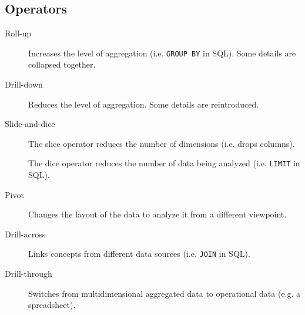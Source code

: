 \subsection{Operators}

\begin{description}
    \item[Roll-up] 
        Increases the level of aggregation (i.e. \texttt{GROUP BY} in SQL). Some details are collapsed together.

    \item[Drill-down] 
        Reduces the level of aggregation. Some details are reintroduced.
    
    \item[Slide-and-dice] 
        The slice operator reduces the number of dimensions (i.e. drops columns).

        The dice operator reduces the number of data being analyzed (i.e. \texttt{LIMIT} in SQL).

    \item[Pivot] 
        Changes the layout of the data to analyze it from a different viewpoint.

    \item[Drill-across] 
        Links concepts from different data sources (i.e. \texttt{JOIN} in SQL).

    \item[Drill-through] 
        Switches from multidimensional aggregated data to operational data (e.g. a spreadsheet).
\end{description}


